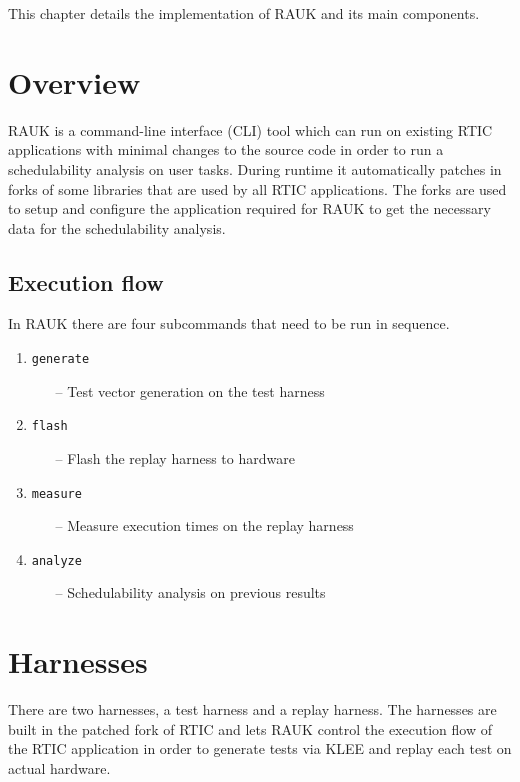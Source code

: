 This chapter details the implementation of RAUK and its main components.

\section{Overview}
RAUK is a command-line interface (CLI) tool which can run on existing RTIC
applications with minimal changes to the source code in order to run a
schedulability analysis on user tasks. During runtime it automatically patches
in forks of some libraries that are used by all RTIC applications. The forks
are used to setup and configure the application required for RAUK to get the
necessary data for the schedulability analysis.

\subsection{Execution flow}
In RAUK there are four subcommands that need to be run in sequence.

\begin{enumerate}
    \item \texttt{generate}
    \begin{itemize}
        \item [--] Test vector generation on the test harness
    \end{itemize}
    \item \texttt{flash}
    \begin{itemize}
        \item [--] Flash the replay harness to hardware
    \end{itemize}
    \item \texttt{measure}
    \begin{itemize}
        \item [--] Measure execution times on the replay harness
    \end{itemize}
    \item \texttt{analyze}
    \begin{itemize}
        \item [--] Schedulability analysis on previous results
    \end{itemize}
\end{enumerate}

\section{Harnesses}
There are two harnesses, a test harness and a replay harness. The harnesses
are built in the patched fork of RTIC and lets RAUK control the execution flow
of the RTIC application in order to generate tests via KLEE and replay each
test on actual hardware.

